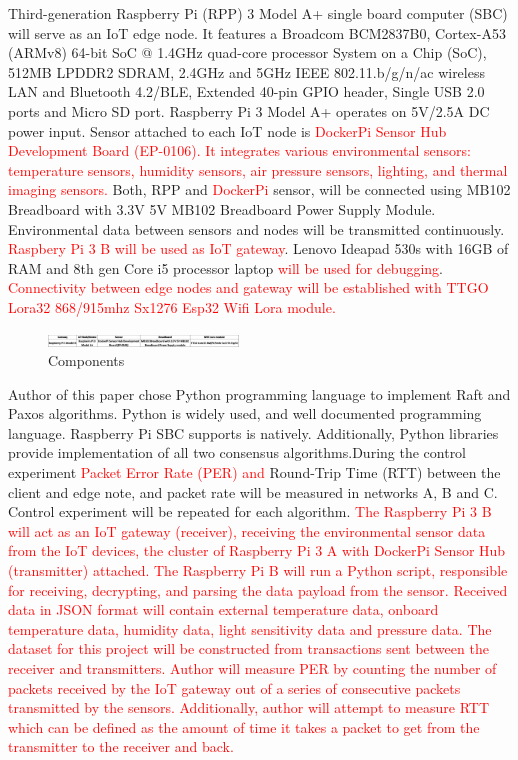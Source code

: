 \documentclass[	DIV=calc,%
							paper=a4,%
							fontsize=11pt,%
							twocolumn]{scrartcl}	 				%
\begin{document}
\noindent Third-generation Raspberry Pi (RPP) 3 Model A+ single board computer (SBC) will serve as an IoT edge node. It features a Broadcom BCM2837B0, Cortex-A53 (ARMv8) 64-bit SoC @ 1.4GHz quad-core processor System on a Chip (SoC), 512MB LPDDR2 SDRAM, 2.4GHz and 5GHz IEEE 802.11.b/g/n/ac wireless LAN and Bluetooth 4.2/BLE, Extended 40-pin GPIO header, Single USB 2.0 ports and Micro SD port. Raspberry Pi 3 Model A+ operates on 5V/2.5A DC power input. Sensor attached to each IoT node is \textcolor{red}{DockerPi Sensor Hub Development Board (EP-0106). It integrates various environmental sensors: temperature sensors, humidity sensors, air pressure sensors, lighting, and thermal imaging sensors.} Both, RPP and \textcolor{red}{DockerPi} sensor, will be connected using MB102 Breadboard with 3.3V 5V MB102 Breadboard Power Supply Module. Environmental data between sensors and nodes will be transmitted continuously. \textcolor{red}{Raspbery Pi 3 B will be used as IoT gateway}. Lenovo Ideapad 530s with 16GB of RAM and 8th gen Core i5 processor laptop \textcolor{red}{will be used for debugging}. \textcolor{red}{Connectivity between edge nodes and gateway will be established with TTGO Lora32 868/915mhz Sx1276 Esp32 Wifi Lora module.}
\begin{figure}[H]
\centering
\includegraphics[width=0.45\textwidth]{images/components.png}
\caption{Components}
\end{figure}
\noindent Author of this paper chose Python programming language to implement Raft and Paxos algorithms. Python is widely used, and well documented programming language. Raspberry Pi SBC supports is natively. Additionally, Python libraries provide implementation of all two consensus algorithms.\smallskip \newline During the control experiment \textcolor{red}{Packet Error Rate (PER) and} Round-Trip Time (RTT) between the client and edge note, and packet rate will be measured in networks A, B and C. Control experiment will be repeated for each algorithm. \textcolor{red}{The Raspberry Pi 3 B will act as an IoT gateway (receiver), receiving the environmental sensor data from the IoT devices, the cluster of Raspberry Pi 3 A with DockerPi Sensor Hub (transmitter) attached. The Raspberry Pi B will run a Python script, responsible for receiving, decrypting, and parsing the data payload from the sensor. Received data in JSON format will contain external temperature data,  onboard temperature data,  humidity data, light sensitivity data and pressure data. 
The dataset for this project will be constructed from transactions sent between the receiver and transmitters. Author will measure PER by counting the number of packets received by the IoT gateway out of a series of consecutive packets transmitted by the sensors. Additionally, author will attempt to measure RTT which can be defined as the amount of time it takes a packet to get from the transmitter to the receiver and back.}
\end{document}
